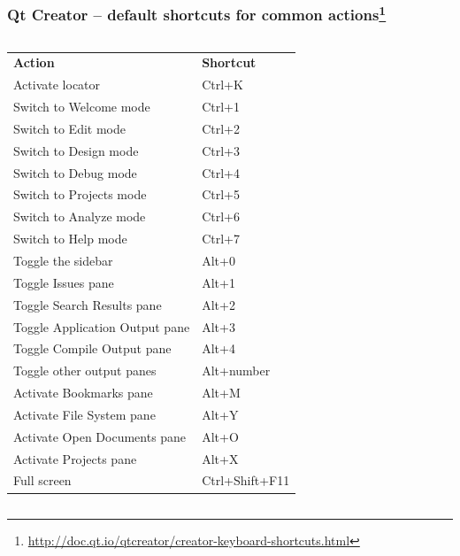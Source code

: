 \begin{frame}
  \frametitle{Qt Creator -- default shortcuts for common actions\footnote
     {\url{http://doc.qt.io/qtcreator/creator-keyboard-shortcuts.html}}}
     \tiny
     \begin{columns}
       \begin{column}{0.5\textwidth}
       \begin{tabular}{|p{}|p{}|}
         \hline
         \textbf{Action} & \textbf{Shortcut} \\
         Activate locator & Ctrl+K \\
         \hline
         Switch to Welcome mode & Ctrl+1 \\
         \hline
         Switch to Edit mode & Ctrl+2 \\
         \hline
         Switch to Design mode & Ctrl+3 \\
         \hline
         Switch to Debug mode & Ctrl+4 \\
         \hline
         Switch to Projects mode &Ctrl+5 \\
         \hline
         Switch to Analyze mode & Ctrl+6 \\
         \hline
         Switch to Help mode & Ctrl+7 \\
         \hline
         Toggle the sidebar & Alt+0 \\
         \hline
         Toggle Issues pane & Alt+1 \\
         \hline
         Toggle Search Results pane & Alt+2 \\
         \hline
         Toggle Application Output pane & Alt+3 \\
         \hline
         Toggle Compile Output pane & Alt+4 \\
         \hline
         Toggle other output panes & Alt+number \\
         \hline
         Activate Bookmarks pane & Alt+M \\
         \hline
         Activate File System pane & Alt+Y \\
         \hline
         Activate Open Documents pane & Alt+O \\
         \hline
         Activate Projects pane & Alt+X \\
         \hline
         Full screen & Ctrl+Shift+F11 \\
         \hline
       \end{tabular}
       \end{column}

\end{columns}
\end{frame}
